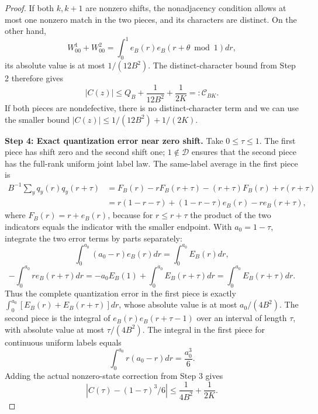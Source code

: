 \documentclass[a4paper,11pt]{article}
\theoremstyle{remark}
\begin{document}
\begin{proof}
If both $k,k+1$ are nonzero shifts, the nonadjacency condition allows at most one nonzero match in the two pieces,
and its characters are distinct. On the other hand,
\[
 W^1_{00}+W^2_{00}=\int_0^1e_B(r)e_B(r+\theta\bmod1)dr,
\]
its absolute value is at most $1/(12B^2)$. The distinct-character bound from Step 2 therefore gives
\begin{equation}\label{eq:paperfarC}
 |C(z)|\le Q_B+\frac1{12B^2}+\frac1{2K}=:\mathcal C_{BK}.
\end{equation}
If both pieces are nondefective, there is no distinct-character term and we can use the smaller bound
$|C(z)|\le1/(12B^2)+1/(2K)$.

\textbf{Step 4: Exact quantization error near zero shift.}
Take $0\le\tau\le1$. The first piece has shift zero and the second shift one; $1\notin\mathcal D$
ensures that the second piece has the full-rank uniform joint label law. The same-label average in the first piece is
\begin{align*}
 B^{-1}\sum_yq_y(r)q_y(r+\tau)
 &=F_B(r)-rF_B(r+\tau)-(r+\tau)F_B(r)+r(r+\tau)\\
 &=r(1-r-\tau)+(1-r-\tau)e_B(r)-r e_B(r+\tau),
\end{align*}
where $F_B(r)=r+e_B(r)$, because for $r\le r+\tau$ the product of the two indicators
equals the indicator with the smaller endpoint. With $a_0=1-\tau$, integrate the two error terms by parts separately:
\[
 \int_0^{a_0}(a_0-r)e_B(r)dr=\int_0^{a_0}E_B(r)dr,
\]
\[
 -\int_0^{a_0}r e_B(r+\tau)dr
 =-a_0E_B(1)+\int_0^{a_0}E_B(r+\tau)dr
 =\int_0^{a_0}E_B(r+\tau)dr.
\]
Thus the complete quantization error in the first piece is exactly
$\int_0^{a_0}[E_B(r)+E_B(r+\tau)]dr$, whose absolute value is at most $a_0/(4B^2)$.
The second piece is the integral of $e_B(r)e_B(r+\tau-1)$ over an interval of length $\tau$, with absolute value at most
$\tau/(4B^2)$. The integral in the first piece for continuous uniform labels equals
\[
 \int_0^{a_0}r(a_0-r)dr=\frac{a_0^3}{6}.
\]
Adding the actual nonzero-state correction from Step 3 gives
\[
 |C(\tau)-(1-\tau)^3/6|\le\frac1{4B^2}+\frac1{2K}.
\]


\end{proof}
\end{document}
